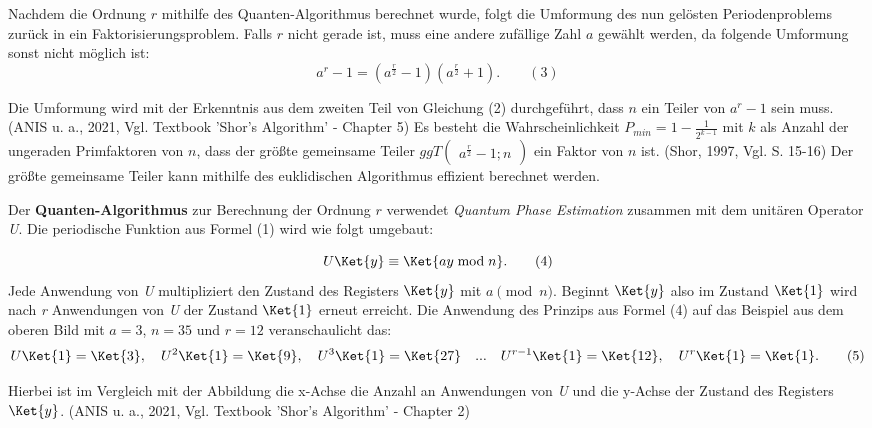     Nachdem die Ordnung \(r\) mithilfe des Quanten-Algorithmus berechnet wurde, folgt die Umformung des nun gelösten Periodenproblems zurück in ein Faktorisierungsproblem. 
    Falls \(r\) nicht gerade ist, muss eine andere zufällige Zahl \(a\) gewählt werden, da folgende Umformung sonst nicht möglich ist:
    \begin{equation} \label{eq:shorUmformung}
         a^r-1 = (a^\frac{r}{2}-1)(a^\frac{r}{2}+1).  
		 \quad \quad (3)
    \end{equation}

	Die Umformung wird mit der Erkenntnis aus dem zweiten Teil von Gleichung (2) durchgeführt, dass \(n\) ein Teiler von \(a^r-1\) sein muss.  (ANIS u. a., 2021, Vgl. Textbook ’Shor’s Algorithm’ - Chapter 5)  Es besteht die Wahrscheinlichkeit \(P_{min}=1-\frac{1}{2^{k-1}}\) mit \(k\) als Anzahl der ungeraden Primfaktoren von \(n\), dass der größte gemeinsame Teiler \(ggT\begin{pmatrix}a^\frac{r}{2}-1; n\end{pmatrix}\) ein Faktor von \(n\) ist. (Shor, 1997, Vgl. S. 15-16) Der größte gemeinsame Teiler kann mithilfe des euklidischen Algorithmus effizient berechnet werden.\newline

	Der \textbf{Quanten-Algorithmus} zur Berechnung der Ordnung \(r\) verwendet \textit{Quantum Phase Estimation} zusammen mit dem unitären Operator \textit{U}. Die periodische Funktion aus Formel (1) wird wie folgt umgebaut:

	\begin{equation}\label{eq:19}
	    U \Ket{y} \equiv \Ket{a y \bmod{n}}.  \quad \quad (4)

	\end{equation}
	Jede Anwendung von \textit{U} multipliziert den Zustand des Registers \(\Ket{y}\) mit \(a\pmod{n}\). Beginnt \(\Ket{y}\) also im Zustand \(\Ket{1}\) wird nach \textit{r} Anwendungen von \textit{U} der Zustand \(\Ket{1}\) erneut erreicht. Die Anwendung des Prinzips aus Formel (4) auf das Beispiel aus dem oberen Bild mit \(a=3\), \(n=35\) und \(r=12\)  veranschaulicht das:
	\begin{gather*}
	    U \Ket{1} = \Ket{3}, \quad U^2 \Ket{1} = \Ket{9}, \quad U^3 \Ket{1} = \Ket{27} \quad ... \quad U^{r-1} \Ket{1} = \Ket{12}, \quad U^r \Ket{1} = \Ket{1}.  \quad \quad (5)
	\end{gather*}

	Hierbei ist im Vergleich mit der Abbildung die x-Achse die Anzahl an Anwendungen von \textit{U} und die y-Achse der Zustand des Registers \(\Ket{y}\). (ANIS u. a., 2021, Vgl. Textbook ’Shor’s Algorithm’ - Chapter 2) \newline
	
